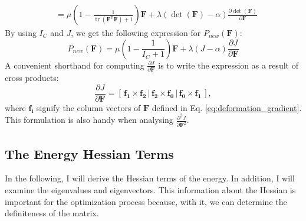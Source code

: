 {{{\begin{align*}
&= \mu \left( 1 - \frac{1}{\operatorname{tr}(\mathbf{F}^\mathsf{T} \mathbf{F}) + 1}\right) \mathbf{F} + \lambda( \operatorname{det}(\mathbf{F})-\alpha)\frac{\partial  \operatorname{det}(\mathbf{F})}{\partial \mathbf{F}}
\end{align*}
By using $I_{C}$ and $J$, we get the following expression for $P_{new}(\mathbf{F})$:
\[
	P_{new}(\mathbf{F}) = \mu \left( 1 - \frac{1}{I_{C} + 1}\right) \mathbf{F} + \lambda( J-\alpha)\frac{\partial  J}{\partial \mathbf{F}}
\]
A convenient shorthand for computing $\frac{\partial J}{\partial \mathbf{F}}$ is to write the expression as a result of cross products:
\begin{equation}\label{eq:cross_product}
\frac{\partial J}{\partial \mathbf{F}} = \left[ \,\mathbf{f_1} \times \mathbf{f_2}\, \bigg| \,\mathbf{f_2} \times \mathbf{f_0}\, \bigg| \,\mathbf{f_0} \times \mathbf{f_1}\, \right],
\end{equation}
where $\mathbf{f_i}$ signify the column vectors of $\mathbf{F}$ defined in Eq. \eqref{eq:deformation_gradient}. This formulation is also handy when analysing $\frac{\partial^2 J}{\partial \mathbf{F}^2}$.

\subsection{The Energy Hessian Terms}
In the following, I will derive the Hessian terms of the energy. In addition, I will examine the eigenvalues and eigenvectors. This information about the Hessian is important for the optimization process because, with it, we can determine the definiteness of the matrix. 

}}}
